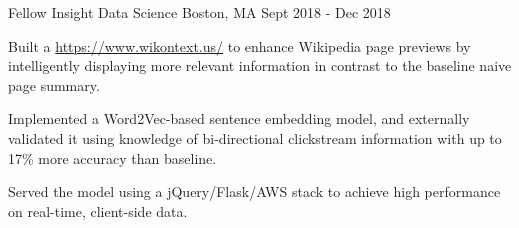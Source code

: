 \begin{cventries}
  \cventry
    {Fellow} %
    {Insight Data Science} %
    {Boston, MA} %
    {Sept 2018 - Dec 2018} %
    {
      \begin{cvitems} %
        \item {Built a \href{Chrome browser extension}{https://www.wikontext.us/} to enhance Wikipedia page previews by intelligently displaying more relevant information in contrast to the baseline naive page summary.}
		\item {Implemented a Word2Vec-based sentence embedding model, and externally validated it using knowledge of bi-directional clickstream information with up to 17\% more accuracy than baseline.}
		\item {Served the model using a jQuery/Flask/AWS stack to achieve high performance on real-time, client-side data.}
      \end{cvitems}
    }


\end{cventries}
